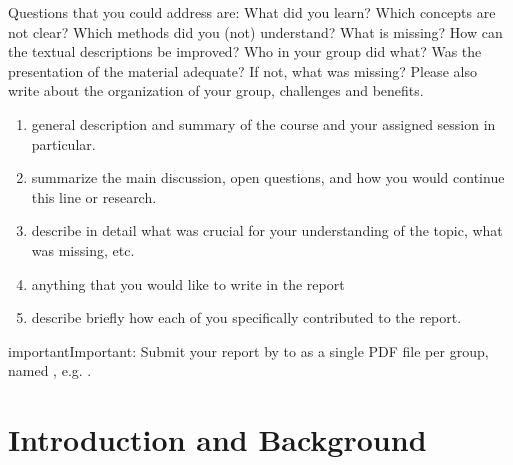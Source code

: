\documentclass[letterpaper,10pt,english]{sphinxmanual}
\begin{document}
\sphinxAtStartPar
Questions that you could address are:
What did you learn? Which concepts are not clear? Which methods did you (not) understand?
What is missing? How can the textual descriptions be improved? Who in your group did what?
Was the presentation of the material adequate? If not, what was missing?
Please also write about the organization of your group, challenges and benefits.

\sphinxAtStartPar
{}
\begin{enumerate}
%
\item {} 
\sphinxAtStartPar
{} general description and summary of the course and your assigned session in particular.

\item {} 
\sphinxAtStartPar
{} summarize the main discussion, open questions, and how you would continue this line or research.

\item {} 
\sphinxAtStartPar
{} describe in detail what was crucial for your understanding of the topic, what was missing, etc.

\item {} 
\sphinxAtStartPar
{} anything that you would like to write in the report

\item {} 
\sphinxAtStartPar
{} describe briefly how each of you specifically contributed to the report.

\end{enumerate}

\begin{sphinxadmonition}{important}{Important:}
\sphinxAtStartPar
Submit your report by  to 
as a single PDF file per group, named , e.g. .
\end{sphinxadmonition}


\chapter{Introduction and Background}
\label{\detokenize{02_introduction:introduction-and-background}}\label{\detokenize{02_introduction::doc}}
\end{document}
